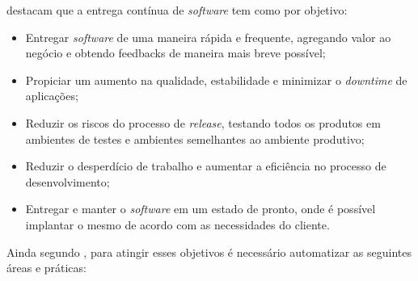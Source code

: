 \documentclass[twoside,english,brazilian]{UNISINOSartigo}
\begin{document}
 destacam que a entrega contínua de \textit{software} tem como por objetivo:
\begin{itemize}
\item Entregar \textit{software} de uma maneira rápida e frequente, agregando valor ao negócio e obtendo feedbacks de maneira mais breve possível;
\item Propiciar um aumento na qualidade, estabilidade  e minimizar o \textit{downtime} de aplicações;
\item Reduzir os riscos do processo de \textit{release}, testando todos os produtos em ambientes de testes e ambientes semelhantes ao ambiente produtivo;
\item Reduzir o desperdício de trabalho e aumentar a eficiência no processo de desenvolvimento;
\item Entregar e manter o \textit{software} em um estado de pronto, onde é possível implantar o mesmo de acordo com as necessidades do cliente.
\end{itemize}
Ainda segundo , para atingir esses objetivos é  necessário automatizar as seguintes áreas e práticas:
\end{document}
